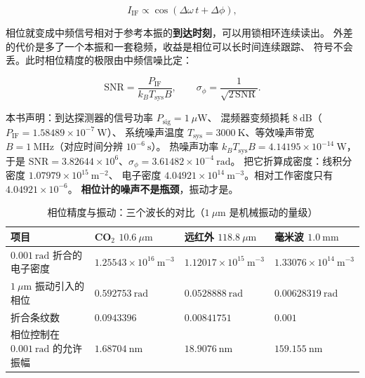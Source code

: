 \begin{equation}
I_{\mathrm{IF}}\propto\cos\left(\Delta\omega\,t+\Delta\phi\right),
\label{eq:app-aq-heterodyne}
\end{equation}

相位就变成中频信号相对于参考本振的\textbf{到达时刻}，可以用锁相环连续读出。
外差的代价是多了一个本振和一套稳频，收益是相位可以长时间连续跟踪、
符号不会丢。此时相位精度的极限由中频信噪比定：

\begin{equation}
\mathrm{SNR} = \frac{P_{\mathrm{IF}}}{k_BT_{\mathrm{sys}}B},
\qquad
\sigma_\phi = \frac{1}{\sqrt{2\,\mathrm{SNR}}}.
\label{eq:app-aq-noise}
\end{equation}

本书声明：到达探测器的信号功率 $P_{\mathrm{sig}} = 1\ \mu\mathrm{W}$、
混频器变频损耗 $8\ \mathrm{dB}$（$P_{\mathrm{IF}} = 1.58489\times10^{-7}\ \mathrm{W}$）、
系统噪声温度 $T_{\mathrm{sys}} = 3000\ \mathrm{K}$、等效噪声带宽
$B = 1\ \mathrm{MHz}$（对应时间分辨 $10^{-6}\ \mathrm{s}$）。
热噪声功率 $k_BT_{\mathrm{sys}}B = 4.14195\times10^{-14}\ \mathrm{W}$，
于是 $\mathrm{SNR} = 3.82644\times10^{6}$、$\sigma_\phi = 3.61482\times10^{-4}\ \mathrm{rad}$。
把它折算成密度：线积分密度 $1.07979\times10^{15}\ \mathrm{m^{-2}}$、
电子密度 $4.04921\times10^{14}\ \mathrm{m^{-3}}$。相对工作密度只有 $4.04921\times10^{-6}$。
\textbf{相位计的噪声不是瓶颈}，振动才是。

\begin{table}[htbp]
\centering
\small
\caption{相位精度与振动：三个波长的对比（$1\ \mu\mathrm{m}$ 是机械振动的量级）}
\label{tab:app-aq-heterodyne}
\setlength{\tabcolsep}{4pt}
\begin{tabular}{p{4.2cm}p{3.0cm}p{3.0cm}p{3.0cm}}
\toprule
项目 & CO$_2$ $10.6\ \mu\mathrm{m}$ & 远红外 $118.8\ \mu\mathrm{m}$ & 毫米波 $1.0\ \mathrm{mm}$ \\
\midrule
$0.001\ \mathrm{rad}$ 折合的电子密度 & $1.25543\times10^{16}\ \mathrm{m^{-3}}$ & $1.12017\times10^{15}\ \mathrm{m^{-3}}$ & $1.33076\times10^{14}\ \mathrm{m^{-3}}$ \\
$1\ \mu\mathrm{m}$ 振动引入的相位 & $0.592753\ \mathrm{rad}$ & $0.0528888\ \mathrm{rad}$ & $0.00628319\ \mathrm{rad}$ \\
折合条纹数 & $0.0943396$ & $0.00841751$ & $0.001$ \\
相位控制在 $0.001\ \mathrm{rad}$ 的允许振幅 & $1.68704\ \mathrm{nm}$ & $18.9076\ \mathrm{nm}$ & $159.155\ \mathrm{nm}$ \\
\bottomrule
\end{tabular}
\end{table}

